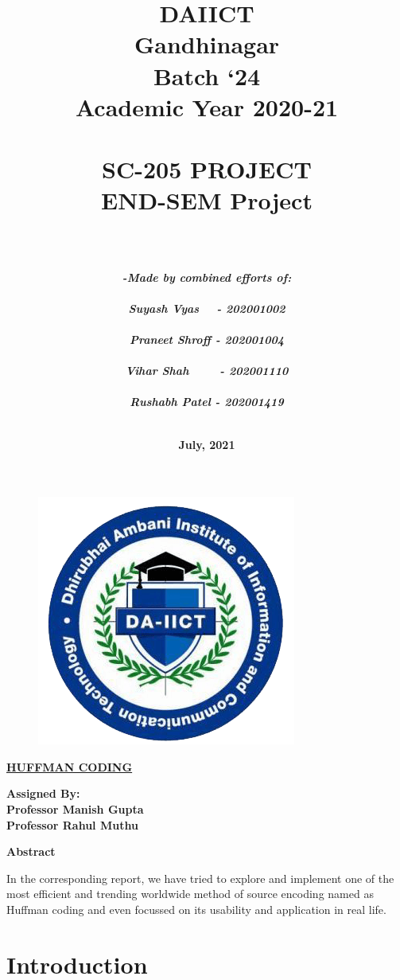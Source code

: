 \documentclass{article}
\title{

\textbf{
    \Huge{DAIICT}\\
    \huge{Gandhinagar}\\
    \huge{Batch ‘24}\\
    \vspace{1cm}
    \LARGE{Academic Year 2020-21}\\\\
    \Huge{SC-205 PROJECT}\\
    \LARGE{END-SEM Project}\\\\
} }
\author
{
    \textit{ \textbf{ \large{-Made by combined efforts of:} } }\\\\
    \textit{ \textbf{ \LARGE{Suyash Vyas \ \ - 202001002} } }\\\\
    \textit{ \textbf{ \LARGE{Praneet Shroff - 202001004} } }\\\\
    \textit{ \textbf{ \LARGE{Vihar Shah \ \ \ \ - 202001110} } }\\\\
    \textit{ \textbf{ \LARGE{Rushabh Patel - 202001419} } }\\\\
}
\date{ \textbf{ \Large{July, 2021} } }
\begin{document}

\begin{figure}[t]
\centerline{ \includegraphics[scale=0.41]{DAIICT_logo.png} }
\label{fig}
\end{figure}

\maketitle

\begin{center}
\underline{\textbf{{\Huge HUFFMAN CODING}}}
\end{center}
\vspace{1cm}

\textbf{ \Large{Assigned By: \\
Professor Manish Gupta \\
Professor Rahul Muthu} }\ \ \ \	



\vspace{2cm}

\begin{center}
\textbf{\Large Abstract\\}

\Large{In the corresponding report, we have tried to explore and implement one 
of the most efficient and trending worldwide method of source 
encoding named as Huffman coding and even focussed 
on its usability and application in real life.\\}
\end{center}

\vspace{1.2cm}

\section{Introduction}
\end{document}
